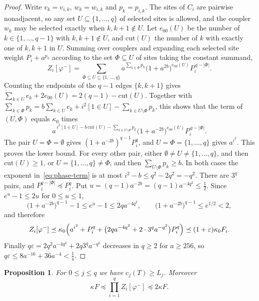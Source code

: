 \documentclass[11pt]{amsart}
\newtheorem{proposition}[theorem]{Proposition}
\theoremstyle{definition}
\theoremstyle{remark}
\numberwithin{equation}{section}
\begin{document}
\begin{proof}
Write $v_k=v_{i,k}$, $w_k=w_{i,k}$ and $p_k=p_{i,k}$. The sites of $C_i$ are pairwise nonadjacent, so any set $U\subseteq\{1,\dots,q\}$ of selected sites is allowed, and the coupler $w_k$ may be selected exactly when $k,k+1\notin U$. Let $e_{00}(U)$ be the number of $k\in\{1,\dots,q-1\}$ with $k,k+1\notin U$, and $\mathrm{cut}(U)$ the number of $k$ with exactly one of $k,k+1$ in $U$. Summing over couplers and expanding each selected site weight $P_i+a^{p_k}$ according to the set $\Phi\subseteq U$ of sites taking the constant summand,
\[
Z_i[\varphi^-]=\sum_{\Phi\subseteq U\subseteq\{1,\dots,q\}}a^{\sum_{k\in\Phi}p_k}\bigl(1+a^{2b}\bigr)^{e_{00}(U)}P_i^{\,q-|\Phi|}.
\]
Counting the endpoints of the $q-1$ edges $\{k,k+1\}$ gives $\sum_{k\in U}e_k+2e_{00}(U)=2(q-1)-\mathrm{cut}(U)$. Together with $\sum_{k\in\Phi}p_k=b\sum_{k\in U}e_k+i^2[1\in U]-\sum_{k\in U\setminus\Phi}p_k$, this shows that the term of $(U,\Phi)$ equals $\kappa_0$ times
\begin{equation}\label{eq:phase-term}
a^{\,i^2[1\in U]-b\,\mathrm{cut}(U)-\sum_{k\in U\setminus\Phi}p_k}\bigl(1+a^{-2b}\bigr)^{e_{00}(U)}P_i^{\,q-|\Phi|}.
\end{equation}
The pair $U=\Phi=\emptyset$ gives $(1+a^{-2b})^{q-1}P_i^q$, and $U=\Phi=\{1,\dots,q\}$ gives $a^{i^2}$. This proves the lower bound. For every other pair, either $\emptyset\ne U\ne\{1,\dots,q\}$, and then $\mathrm{cut}(U)\ge1$, or $U=\{1,\dots,q\}\ne\Phi$, and then $\sum_{U\setminus\Phi}p_k\ge b$. In both cases the exponent in~\eqref{eq:phase-term} is at most $i^2-b\le q^2-2q^2=-q^2$. There are $3^q$ pairs, and $P_i^{q-|\Phi|}\preceq P_i^q$. Put $u=(q-1)a^{-2b}=(q-1)a^{-4q^2}\le\frac12$. Since $e^u-1\le2u$ for $0\le u\le1$,
\[
\bigl(1+a^{-2b}\bigr)^{q-1}-1\le e^u-1\le2qa^{-4q^2},\qquad\bigl(1+a^{-2b}\bigr)^{q-1}\le e^{1/2}<2,
\]
and therefore
\[
Z_i[\varphi^-]\preceq\kappa_0\Bigl(a^{i^2}+P_i^q+\bigl(2qa^{-4q^2}+2\cdot3^qa^{-q^2}\bigr)P_i^q\Bigr)\preceq(1+\varepsilon)\kappa_0F_i.
\]
Finally $q\varepsilon=2q^2a^{-4q^2}+2q3^qa^{-q^2}$ decreases in $q\ge2$ for $a\ge256$, so $q\varepsilon\le8a^{-16}+36a^{-4}<\frac14$.
\end{proof}

\begin{proposition}\label{prop:lower}
For $0\le j\le q$ we have $c_j(T)\ge L_j$. Moreover
\begin{equation}\label{eq:model-product}
\kappa F\preceq\prod_{i=1}^qZ_i[\varphi^-]\preceq2\kappa F.
\end{equation}
\end{proposition}
\end{document}
